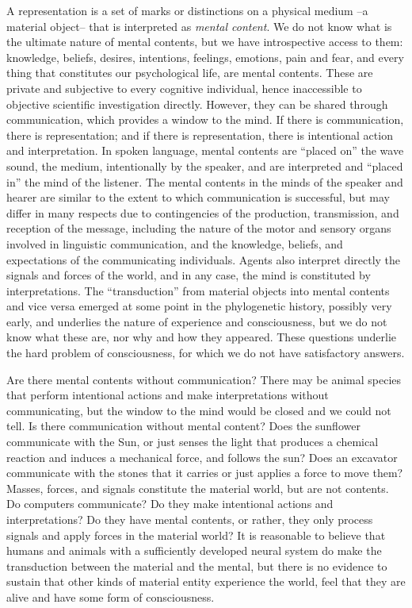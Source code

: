 \documentclass[11pt]{article}
\begin{document}
A representation is a set of marks or distinctions on a physical medium --a material object-- that is interpreted as \emph{mental content}. We do not know what is the ultimate nature of mental contents, but we have introspective access to them: knowledge, beliefs, desires, intentions, feelings, emotions, pain and fear, and every thing that constitutes our psychological life, are mental contents. These are private and subjective to every cognitive individual, hence inaccessible to objective scientific investigation directly. However, they can be shared through communication, which provides a window to the mind. If there is communication, there is representation; and if there is representation, there is intentional action and interpretation. In spoken language, mental contents are ``placed on'' the wave sound, the medium, intentionally by the speaker, and are interpreted and ``placed in'' the mind of the listener. The mental contents in the minds of the speaker and hearer are similar to the extent to which communication is successful, but may differ in many respects due to contingencies of the production, transmission, and reception of the message, including the nature of the motor and sensory organs involved in linguistic communication, and the knowledge, beliefs, and expectations of the communicating individuals. Agents also interpret directly the signals and forces of the world, and in any case, the mind is constituted by interpretations. The ``transduction'' from material objects into mental contents and vice versa emerged at some point in the phylogenetic history, possibly very early, and underlies the nature of experience and consciousness, but we do not know what these are, nor why and how they appeared. These questions underlie the hard problem of consciousness, for which we do not have satisfactory answers. 

 Are there mental contents without communication? There may be animal species that perform intentional actions and make interpretations without communicating, but the window to the mind would be closed and we could not tell. Is there communication without mental content? Does the sunflower communicate with the Sun, or just senses the light that produces a chemical reaction and induces a mechanical force, and follows the sun? Does an excavator communicate with the stones that it carries or just applies a force to move them? Masses, forces, and signals constitute the material world, but are not contents. Do computers communicate? Do they make intentional actions and interpretations? Do they have mental contents, or rather, they only process signals and apply forces in the material world? It is reasonable to believe that humans and animals with a sufficiently developed neural system do make the transduction between the material and the mental, but there is no evidence to sustain that other kinds of material entity experience the world, feel that they are alive and have some form of consciousness.
\end{document}

